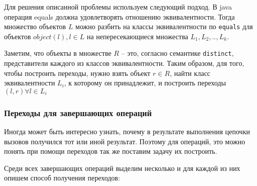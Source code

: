 Для решения описанной проблемы используем следующий подход. В java операция equals должна удовлетворять отношению эквивалентности. Тогда множество объектов $L$ можно разбить на классы эквивалентности по \texttt{equals} для объектов $object(l), l \in L$ на непересекающиеся множества $L_1, L_2, .., L_k$. 

Заметим, что объекты в множестве $R$ -- это, согласно семантике \texttt{distinct}, представители каждого из классов эквивалентности. Таким образом, для того, чтобы построить переходы, нужно взять объект $r \in R$, найти класс эквивалентности $L_i$, к которому он принадлежит, и построить переходы $(l, r) \forall l \in L_i$

\subsubsection{Переходы для завершающих операций}
Иногда может быть интересно узнать, почему в результате выполнения цепочки вызовов получился тот или иной результат. Поэтому для операций, это можно понять при помощи переходов так же поставим задачу их построить.

Среди всех завершающих операций выделим несколько и для каждой из них опишем способ получения переходов:

